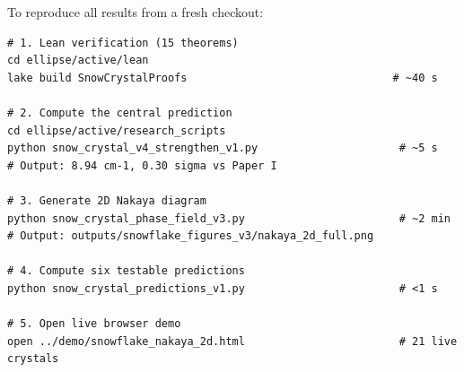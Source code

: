 \documentclass[11pt,a4paper]{article}
\begin{document}
To reproduce all results from a fresh checkout:

\begin{lstlisting}[basicstyle=\ttfamily\scriptsize]
# 1. Lean verification (15 theorems)
cd ellipse/active/lean
lake build SnowCrystalProofs                                # ~40 s

# 2. Compute the central prediction
cd ellipse/active/research_scripts
python snow_crystal_v4_strengthen_v1.py                      # ~5 s
# Output: 8.94 cm-1, 0.30 sigma vs Paper I

# 3. Generate 2D Nakaya diagram
python snow_crystal_phase_field_v3.py                        # ~2 min
# Output: outputs/snowflake_figures_v3/nakaya_2d_full.png

# 4. Compute six testable predictions
python snow_crystal_predictions_v1.py                        # <1 s

# 5. Open live browser demo
open ../demo/snowflake_nakaya_2d.html                        # 21 live crystals
\end{lstlisting}
\end{document}
